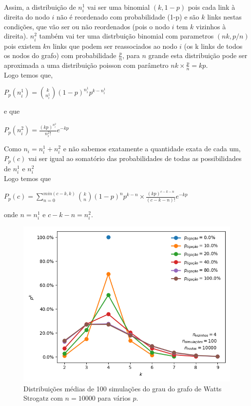 \documentclass[conference, twocolumn]{IEEEtran}
\theoremstyle{plain}
\theoremstyle{definition}
\theoremstyle{remark}
\begin{document}
Assim, a distribuição de $n_{i}^{1}$ vai ser uma binomial $(k,1-p)$ pois cada link à direita do nodo $i$ não é reordenado com probabilidade (1-p) e são $k$ links nestas condições, que vão ser ou não reordenados (pois o nodo $i$ tem $k$ vizinhos à direita). $n_{i}^{2}$  também vai ter uma distrbuição binomial com parametros $(nk, p/n)$ pois existem $kn$ links que podem ser reassociados ao nodo $i$ (os k links de todos os nodos do grafo) com probabilidade $\frac{p}{n}$, para $n$ grande esta distribuição pode ser aproximada a uma distribuição poisson com parâmetro $nk\times{\frac{p}{n}}= kp$.\\

Logo temos que,\\
\begin{center}
    $P_{p}(n_{i}^{1})= \binom{k}{n_{i}^{1}} (1-p)^{n_{i}^{1}} p^{k-n_{i}^{1}}$
\end{center}
e que \\
\begin{center}
    $P_{p}(n_{i}^{2}) = \frac{(kp)^{n_{i}^{2}}}{n_{i}^{2}!} e^{-kp}$
\end{center}
Como $n_{i}=n_{i}^{1}+n_{i}^{2}$ e não sabemos exatamente a quantidade exata de cada um, $P_{p}(c)$ vai ser igual ao somatório das probabilidades de todas as possibilidades de $n_{i}^{1}$ e $n_{i}^{2}$\\

Logo temos que\\
\begin{center}
    $P_{p}(c)= \sum_{n=0}^{min(c-k,k)} \binom{k}{n}(1-p)^{n} p^{k-n} \times \frac{(kp)^{c-k-n}}{(c-k-n)!} e^{-kp}$
\end{center}
onde $n=n_{i}^{1}$ e $c-k-n=n_{i}^{2}$.

\begin{figure}[h]
    \centering
    \includegraphics[width=1\linewidth]{images/watts_strogatz_degree_distribution.png}
    \caption{\small Distribuições médias de 100 simulações do grau do grafo de Watts Strogatz com $n = 10000$ para vários $p$.}
    \label{fig:watts_strogatz_degree_distribution}
\end{figure}
\end{document}
